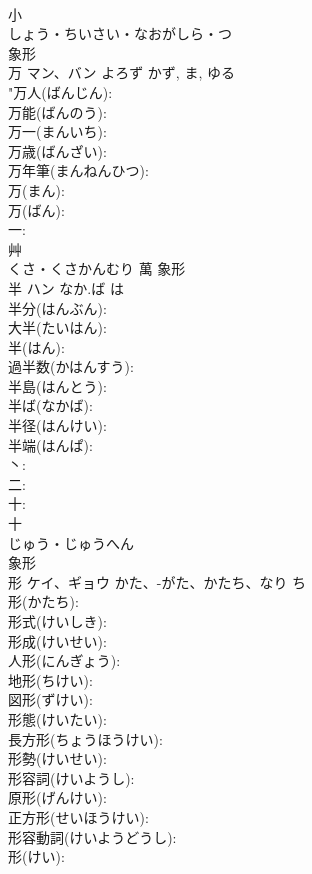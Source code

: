 \documentclass[8pt]{extreport}
\begin{document}
\begin{CJK}{UTF8}{min}
\\	小	
\\	しょう・ちいさい・なおがしら・つ	
\\	象形 
\\	万	マン、バン	よろず	かず, ま, ゆる	
\\	"万人(ばんじん): 
\\	万能(ばんのう): 
\\	万一(まんいち): 
\\	万歳(ばんざい): 
\\	万年筆(まんねんひつ): 
\\	万(まん): 
\\	万(ばん): 
\\	一: 
\\	艸	
\\	くさ・くさかんむり	萬	象形 
\\	半	ハン	なか.ば	は	
\\	半分(はんぶん): 
\\	大半(たいはん): 
\\	半(はん): 
\\	過半数(かはんすう): 
\\	半島(はんとう): 
\\	半ば(なかば): 
\\	半径(はんけい): 
\\	半端(はんぱ): 
\\	丶: 
\\	二: 
\\	十: 
\\	十	
\\	じゅう・じゅうへん	
\\	象形 
\\	形	ケイ、ギョウ	かた、-がた、かたち、なり	ち	
\\	形(かたち): 
\\	形式(けいしき): 
\\	形成(けいせい): 
\\	人形(にんぎょう): 
\\	地形(ちけい): 
\\	図形(ずけい): 
\\	形態(けいたい): 
\\	長方形(ちょうほうけい): 
\\	形勢(けいせい): 
\\	形容詞(けいようし): 
\\	原形(げんけい): 
\\	正方形(せいほうけい): 
\\	形容動詞(けいようどうし): 
\\	形(けい): 

\end{CJK}
\end{document}
